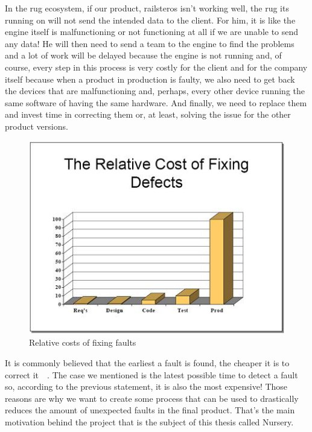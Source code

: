 \documentclass[12pt]{article}
\theoremstyle{definition}
\theoremstyle{definition}
\theoremstyle{remark}
\begin{document}
In the \gls{rug} ecosystem, if our product, \gls{railsteros} isn't working well, the \gls{rug} its running on will not send the intended data to the client. For him, it is like the engine itself is malfunctioning or not functioning at all if we are unable to send any data! He will then need to send a team to the engine to find the problems and a lot of work will be delayed because the engine is not running and, of course, every step in this process is very costly for the client and for the company itself because when a product in production is faulty, we also need to get back the devices that are malfunctioning and, perhaps, every other device running the same software of having the same hardware. And finally, we need to replace them and invest time in correcting them or, at least, solving the issue for the other product versions.\\

\begin{figure}
    \centering
    \includegraphics[scale=0.8]{STBC-costfixs}
    \caption{Relative costs of fixing faults~\cite{EconomicsSTBC:2017}}
    \label{STBC-costfixs}
\end{figure}

It is commonly believed that the earliest a fault is found, the cheaper it is to correct it~\cite{EconomicsSTBC:2017}~\cite{EconomicsWiki:2017}. The case we mentioned is the latest possible time to detect a fault so, according to the previous statement, it is also the most expensive! Those reasons are why we want to create some process that can be used to drastically reduces the amount of unexpected faults in the final product. That's the main motivation behind the project that is the subject of this thesis called Nursery.\\
\end{document}
